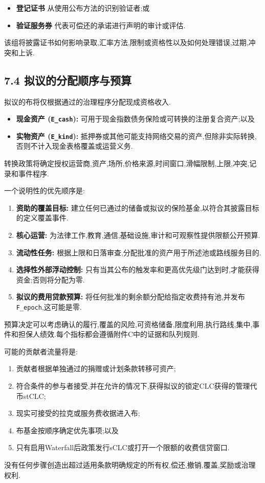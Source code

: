 \documentclass[11pt]{article}
\begin{document}
\begin{itemize}[leftmargin=*]
\item \textbf{登记证书} 从使用公布方法的识别验证者;或
\item \textbf{验证服务券} 代表可偿还的承诺进行声明的审计或评估.
\end{itemize}
该组将披露证书如何影响录取,汇率方法,限制或资格性以及如何处理错误,过期,冲突和上诉.

\subsection*{7.4 拟议的分配顺序与预算}

拟议的布将仅根据通过的治理程序分配现成资格收入.

\begin{itemize}[leftmargin=*]
\item \textbf{现金资产 (\texttt{E\_cash}):} 可用于现金指数债务保险或可转换的注册复合资产;以及
\item \textbf{实物资产 (\texttt{E\_kind}):} 抵押券或其他可能支持网络交易的资产,但除非实际转换,否则不计入现金表格覆盖或运营义务.
\end{itemize}
转换政策将确定授权运营商,资产,场所,价格来源,时间窗口,滑幅限制,上限,冲突,记录和事件程序.

一个说明性的优先顺序是:

\begin{enumerate}[leftmargin=*]
\item \textbf{资助的覆盖目标:} 建立任何已通过的储备或拟议的保险基金,以符合其披露目标的定义覆盖事件.
\item \textbf{核心运营:} 为法律工作,教育,通信,基础设施,审计和可观察性提供限额公开预算.
\item \textbf{流动性任务:} 根据上限和日落审查,分配批准的资产用于所述池或路线服务目的.
\item \textbf{选择性外部浮动控制:} 只有当其公布的触发率和更高优先级门达到时,才能获得资金;否则将分配为零.
\item \textbf{拟议的费用贷款预算:} 将任何批准的剩余额分配给指定收费持有池,并发布 \texttt{F\_epoch},这可能是零.
\end{enumerate}
预算决定可以考虑确认的履行,覆盖的风险,可资格储备,限度利用,执行路线,集中,事件和担保人绩效.每个指标都会遵循附件C中的证据和队列规则.

可能的贡献者流量将是:

\begin{enumerate}[leftmargin=*]
\item 贡献者根据单独通过的捐赠或计划条款转移可资产;
\item 符合条件的参与者接受,并在允许的情况下,获得拟议的锁定CLC获得的管理代币stCLC;
\item 现实可接受的拉克或服务费收据进入布;
\item 布基金按顺序确定优先事项;以及
\item 只有启用Waterfall后政策发行sCLC或打开一个限额的收费信贷窗口.
\end{enumerate}
没有任何步骤创造出超过适用条款明确规定的所有权,偿还,撤销,覆盖,奖励或治理权利.
\end{document}

